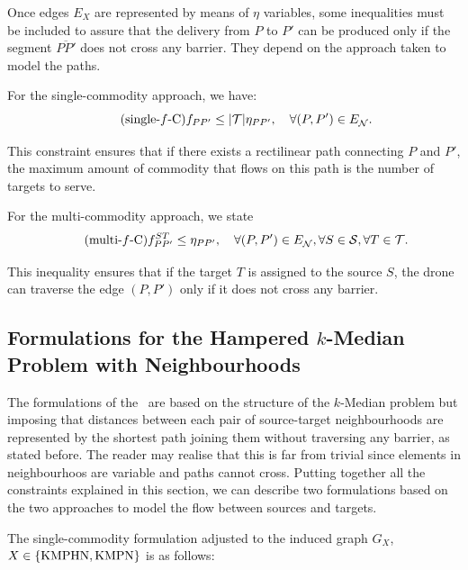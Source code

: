 \documentclass[a4paper,  review, authoryear, 1p.]{elsarticle}
\newcommand{\KMPHN}{{\sf{H-KMPHN}}}
\newcommand{\KMPN}{{\sf{H-KMPN}\xspace }}
\newcommand{\EN}{{E^{}_{\mathcal N}}}
\newcommand{\JP}[1]{{\color{blue}#1}}
\newcommand{\CV}[1]{{\color{blue}#1}}
\newcommand{\segment}[2]{\overline{#1#2}}
\begin{document}
	\CV{
		Once edges $E_X$ are represented by means of $\eta$ variables, some inequalities must be included to assure that the delivery from $P$ to $P'$ can be produced only if the segment $\segment{P}{P'}$ does not cross any barrier. They depend on the approach taken to model the paths.
		
		For the single-commodity approach, we have:
		\begin{equation*}\tag{single-$f$-C}\label{eq:single-fC}
			f_{PP'}\leq  |\mathcal T|\etavar{P}{P'},\quad\forall (P, P')\in \EN.
		\end{equation*}
		
		This constraint ensures that if there exists a rectilinear path connecting $P$ and $P'$, the maximum amount of commodity that flows on this path is the number of targets to serve.
		
		For the multi-commodity approach, we state
		\begin{equation*}\tag{multi-$f$-C}\label{eq:multi-fC}
			f_{PP'}^{ST}\leq  \etavar{P}{P'},\quad\forall (P, P')\in \EN, \forall S\in\mathcal S, \forall T\in\mathcal T.
		\end{equation*}
	
		This inequality ensures that if the target $T$ is assigned to the source $S$, the drone can traverse the edge $(P, P')$ only if it does not cross any barrier.}
	
 
		
	\subsection{Formulations for the Hampered $k$-Median Problem with Neighbourhoods}\label{ssec:KMPHN}
	
	\CV{The formulations of the \KMPN \ are based on the structure of the  $k$-Median problem but imposing that distances between each pair of source-target neighbourhoods are represented by the shortest path joining them without traversing any barrier, as stated before. \JP{The reader may realise that this is far from trivial since elements in neighbourhoos are variable and paths cannot cross.} Putting together all the constraints explained in this section, we can describe two formulations based on the two approaches to model the flow between sources and targets. 
		
	The single-commodity formulation adjusted to the induced graph $G_X$, $X\in \{\rm KMPHN, \rm KMPN\}$ is as follows:}
	
	
	\newcommand{\xvar}[2]{x(#1#2)}
\end{document}

